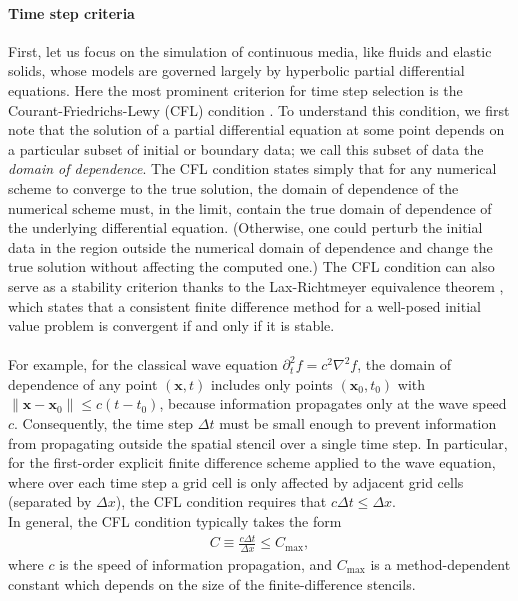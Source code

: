 \paragraph*{Time step criteria}
First, let us focus on the simulation of continuous media, like fluids and elastic solids, whose models are governed largely by hyperbolic partial differential equations.
Here the most prominent criterion for time step selection is the Courant-Friedrichs-Lewy (CFL) condition \cite{Courant1928}.
To understand this condition, we first note that the solution of a partial differential equation at some point depends on a particular subset of initial or boundary data; we call this subset of data the \emph{domain of dependence}.
The CFL condition states simply that for any numerical scheme to converge to the true solution, the domain of dependence of the numerical scheme must, in the limit, contain the true domain of dependence of the underlying differential equation.
(Otherwise, one could perturb the initial data in the region outside the numerical domain of dependence and change the true solution without affecting the computed one.)
The CFL condition can also serve as a stability criterion thanks to the Lax-Richtmeyer equivalence theorem \cite{Lax1956,Strikwerda2004}, which states that a consistent finite difference method for a well-posed initial value problem is convergent if and only if it is stable.
\\ \\
For example, for the classical wave equation $\partial_t^2 f = c^2\nabla^2 f$, the domain of dependence of any point $(\mathbf x, t)$ includes only points $(\mathbf x_0, t_0)$ with $\|\mathbf x-\mathbf x_0\|\le c(t-t_0)$, because information propagates only at the wave speed $c$.
Consequently, the time step $\Delta t$ must be small enough to prevent information from propagating outside the spatial stencil over a single time step.
In particular, for the first-order explicit finite difference scheme applied to the wave equation, where over each time step a grid cell is only affected by adjacent grid cells (separated by $\Delta x$), the CFL condition requires that $c\Delta t \le \Delta x$.
\\
In general, the CFL condition typically takes the form
\begin{align}
  \label{eq:cfl}
  C \equiv \frac{c\Delta t}{\Delta x} \le C_{\max},
\end{align}
where $c$ is the speed of information propagation, and $C_{\max}$ is a method-dependent constant which depends on the size of the finite-difference stencils.
